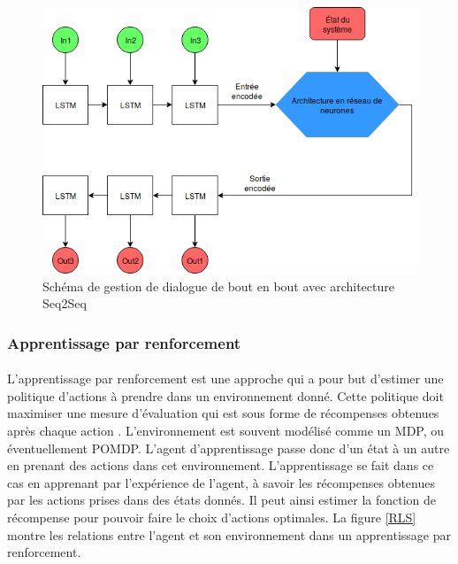 \begin{figure}
	\centering
	\includegraphics[width=.7\linewidth]{images/DM/DMSeq2Seq.png} 
	\caption{Schéma de gestion de dialogue de bout en bout avec architecture Seq2Seq}\label{Seq2seq}
\end{figure}
\subsubsection{Apprentissage par renforcement} \label{reinf_learning}
\paragraph{}
L'apprentissage par renforcement est une approche qui a pour but d'estimer une politique d'actions à prendre dans un environnement donné. Cette politique doit maximiser une mesure d'évaluation qui est sous forme de récompenses obtenues après chaque action \citep{Weisz2018}. L'environnement est souvent modélisé comme un MDP, ou éventuellement POMDP. L'agent d'apprentissage passe donc d'un état à un autre en prenant des actions dans cet environnement. L'apprentissage se fait dans ce cas en apprenant par l'expérience de l'agent, à savoir les récompenses obtenues par les actions prises dans des états donnés. Il peut ainsi estimer la fonction de récompense pour pouvoir faire le choix d'actions optimales. La figure \ref{RLS} montre les relations entre l'agent et son environnement dans un apprentissage par renforcement.

